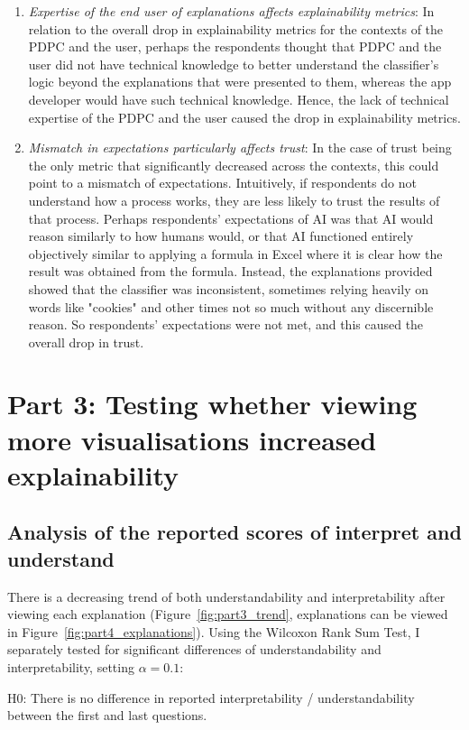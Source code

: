 \begin{enumerate}
    \item \textit{Expertise of the end user of explanations affects explainability metrics}: In relation to the overall drop in explainability metrics for the contexts of the PDPC and the user, perhaps the respondents thought that PDPC and the user did not have technical knowledge to better understand the classifier's logic beyond the explanations that were presented to them, whereas the app developer would have such technical knowledge. Hence, the lack of technical expertise of the PDPC and the user caused the drop in explainability metrics.
     
    \item \textit{Mismatch in expectations particularly affects trust}: In the case of trust being the only metric that significantly decreased across the contexts, this could point to a mismatch of expectations. Intuitively, if respondents do not understand how a process works, they are less likely to trust the results of that process. Perhaps respondents' expectations of AI was that AI would reason similarly to how humans would, or that AI functioned entirely objectively similar to applying a formula in Excel where it is clear how the result was obtained from the formula. Instead, the explanations provided showed that the classifier was inconsistent, sometimes relying heavily on words like "cookies" and other times not so much without any discernible reason. So respondents' expectations were not met, and this caused the overall drop in trust.
\end{enumerate}

\section{Part 3: Testing whether viewing more visualisations increased explainability}
\subsection{Analysis of the reported scores of interpret and understand}
\label{sec:interpret_understand}
There is a decreasing trend of both understandability and interpretability after viewing each explanation (Figure~\ref{fig:part3_trend}, explanations can be viewed in Figure~\ref{fig:part4_explanations}). Using the Wilcoxon Rank Sum Test, I separately tested for significant differences of understandability and interpretability, setting $\alpha = 0.1$: 

\noindent H0: There is no difference in reported interpretability / understandability between the first and last questions.

